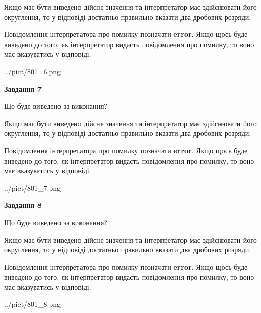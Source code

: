 \documentclass[12pt, ukrainian]{article}
\begin{document}
{\begin {Large}
Якщо має бути виведено дійсне значення та інтерпретатор має здійснювати його округлення, 
то у відповіді достатньо правильно вказати два дробових розряди.

Повідомлення інтерпретатора про помилку позначати \textbf{error}.
Якщо щось буде виведено до того, як інтерпретатор видасть повідомлення про помилку, 
то воно має вказуватись у відповіді. \par

\begin{center}
	{../pict/801_6.png}
\end{center}
\newpage

{\begin {center}\textbf{Завдання 7}\end {center}}\par
Що буде виведено за виконання? \par

Якщо має бути виведено дійсне значення та інтерпретатор має здійснювати його округлення, 
то у відповіді достатньо правильно вказати два дробових розряди.

Повідомлення інтерпретатора про помилку позначати \textbf{error}.
Якщо щось буде виведено до того, як інтерпретатор видасть повідомлення про помилку, 
то воно має вказуватись у відповіді. \par

\begin{center}
	{../pict/801_7.png}
\end{center}
\newpage

{\begin {center}\textbf{Завдання 8}\end {center}}\par
Що буде виведено за виконання? \par

Якщо має бути виведено дійсне значення та інтерпретатор має здійснювати його округлення, 
то у відповіді достатньо правильно вказати два дробових розряди.

Повідомлення інтерпретатора про помилку позначати \textbf{error}.
Якщо щось буде виведено до того, як інтерпретатор видасть повідомлення про помилку, 
то воно має вказуватись у відповіді. \par

\begin{center}
	{../pict/801_8.png}
\end{center}
\newpage


\end{Large}}
\end{document}
